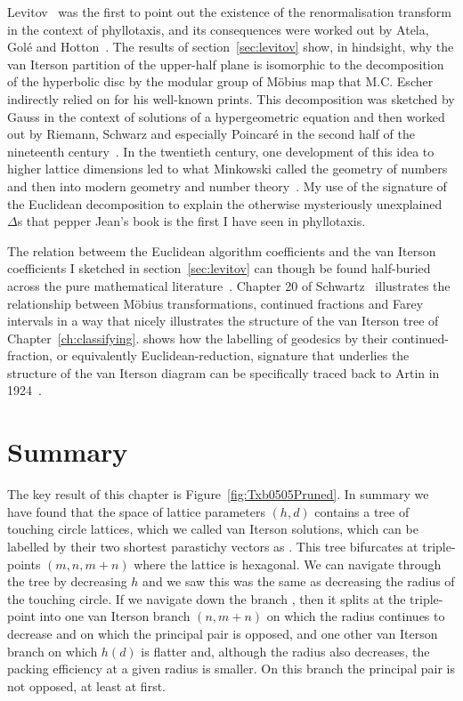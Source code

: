 Levitov~\cite{levitovFibonacciNumbersBotany1991} was the first to point out the existence of the renormalisation transform in the context of phyllotaxis, and its consequences were worked out by Atela, Golé and Hotton~\autocite{atelaDynamicalSystemPlant2002}. 
 The results of section~\ref{sec:levitov} show, in hindsight, why the van Iterson partition of the upper-half plane is isomorphic to the decomposition of the hyperbolic disc by the modular group of M{\"o}bius map that M.C. Escher indirectly relied on for his well-known prints. This decomposition was sketched by Gauss in the context of solutions of a hypergeometric equation and then worked out by Riemann,  Schwarz and especially Poincar\'{e} in the second half of the nineteenth century~\cite{gaussBemerkungFragmentenUber2011,poincarePapersFuchsianFunctions1985,schwarzUeberDiejenigenFalle1873,johnstillwellTranslatorNotePoincare1996}. 
  In the twentieth century, one development of this idea to higher lattice dimensions led to what Minkowski called the geometry of numbers and then into modern geometry and number theory~\cite{bergerGeometryRevealedJacob2010}.
My use of the signature of the Euclidean decomposition to explain the otherwise mysteriously unexplained $\Delta$s that pepper Jean's book is the first I have seen in phyllotaxis. 

The relation betweem the Euclidean algorithm coefficients and the van Iterson coefficients I sketched in section~\ref{sec:levitov} can though be found half-buried across the pure mathematical literature~\cite{conradIdealClassesSL22024}.   Chapter 20 of Schwartz~\cite{schwartzMostlySurfaces2011} illustrates the relationship between M\"obius transformations, continued fractions and Farey intervals in a way that nicely illustrates the structure of the van Iterson tree of Chapter~\ref{ch:classifying}. \cite{katokSymbolicDynamicsModular2007} shows how the labelling of geodesics by their continued-fraction, or equivalently Euclidean-reduction, signature  that underlies the structure of the van Iterson diagram can be specifically traced back to Artin in 1924~\cite{artinMechanischesSystemMit1924}. 
 

\section{Summary}
\label{sec:ClassifyingSummary}
The key result of this chapter is Figure~\ref{fig:Txb0505Pruned}. In summary we have found that the space of lattice parameters $(h,d)$ contains a tree of touching circle lattices, which we called van Iterson solutions, which can be  labelled by their two shortest parastichy vectors as . This tree bifurcates at triple-points $(m,n,m+n)$ where the lattice is hexagonal. We can navigate through the tree by decreasing $h$ and we saw this was the same as decreasing the radius of the touching circle. If we navigate down the branch , then it splits at the triple-point
into one van Iterson branch $(n,m+n)$ on which the radius continues to decrease and on which the principal pair is opposed, and one other van Iterson branch on which  $h(d)$ is flatter and, although the radius also decreases, the packing efficiency at a given radius is smaller. On this branch the principal pair is not opposed, at least at first. 


